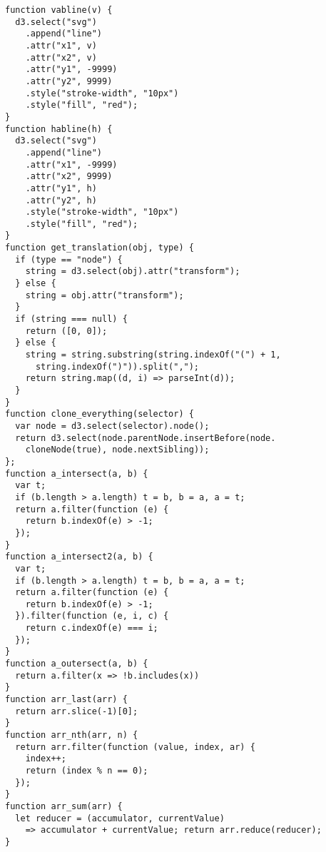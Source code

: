 \begin{lstlisting}
function vabline(v) {
  d3.select("svg")
    .append("line")
    .attr("x1", v)
    .attr("x2", v)
    .attr("y1", -9999)
    .attr("y2", 9999)
    .style("stroke-width", "10px")
    .style("fill", "red");
}
function habline(h) {
  d3.select("svg")
    .append("line")
    .attr("x1", -9999)
    .attr("x2", 9999)
    .attr("y1", h)
    .attr("y2", h)
    .style("stroke-width", "10px")
    .style("fill", "red");
}
function get_translation(obj, type) {
  if (type == "node") {
    string = d3.select(obj).attr("transform");
  } else {
    string = obj.attr("transform");
  }
  if (string === null) {
    return ([0, 0]);
  } else {
    string = string.substring(string.indexOf("(") + 1,
      string.indexOf(")")).split(",");
    return string.map((d, i) => parseInt(d));
  }
}
function clone_everything(selector) {
  var node = d3.select(selector).node();
  return d3.select(node.parentNode.insertBefore(node.
    cloneNode(true), node.nextSibling));
};
function a_intersect(a, b) {
  var t;
  if (b.length > a.length) t = b, b = a, a = t;
  return a.filter(function (e) {
    return b.indexOf(e) > -1;
  });
}
function a_intersect2(a, b) {
  var t;
  if (b.length > a.length) t = b, b = a, a = t;
  return a.filter(function (e) {
    return b.indexOf(e) > -1;
  }).filter(function (e, i, c) {
    return c.indexOf(e) === i;
  });
}
function a_outersect(a, b) {
  return a.filter(x => !b.includes(x))
}
function arr_last(arr) {
  return arr.slice(-1)[0];
}
function arr_nth(arr, n) {
  return arr.filter(function (value, index, ar) {
    index++;
    return (index % n == 0);
  });
}
function arr_sum(arr) {
  let reducer = (accumulator, currentValue) 
    => accumulator + currentValue; return arr.reduce(reducer);
}


\end{lstlisting}
